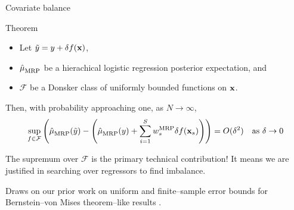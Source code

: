 
\begin{frame}[t]{Covariate balance}

\begin{block}{Theorem}
    \begin{itemize}
        \item Let $\tilde{y} = y + \delta f(\mathbf{x})$,
        \item $\hat{\mu}^{}_{\mathrm{MRP}}$ be a hierachical logistic regression posterior expectation, and
        \item $\mathcal{F}$ be a Donsker class of uniformly bounded functions on $\mathbf{x}$.
    \end{itemize}
    Then, with probability approaching one, as $N \rightarrow \infty$,
    $$
    \begin{aligned}
        \sup_{f \in \mathcal{F}} \left(
            \hat{\mu}^{}_{\mathrm{MRP}}(\tilde{y}) -
            \left(\hat{\mu}^{}_{\mathrm{MRP}}(y) + \sum_{i=1}^S w_s^{\mathrm{MRP}} \delta f(\mathbf{x}_s) \right)
            \right)
        = O(\delta^2)
        \quad\textrm{as }\delta \rightarrow 0
    \end{aligned}
    $$
\end{block}

The supremum over $\mathcal{F}$ is the primary technical contribution!
It means we are justified in searching over regressors
to find imbalance.

Draws on our prior work on uniform and finite--sample error bounds for Bernstein--von Mises
theorem--like results \parencite{giordano:2024:bayesij,kasprzak:2025:laplace}.


\end{frame}




